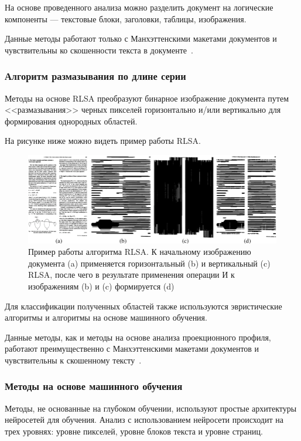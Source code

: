 На основе проведенного анализа можно разделить документ на логические компоненты --- текстовые блоки, заголовки, таблицы, изображения.

Данные методы работают только с Манхэттенскими макетами документов и чувствительны ко скошенности текста в документе~\cite{dla-book}.

\subsubsection{Алгоритм размазывания по длине серии}

Методы на основе RLSA преобразуют бинарное изображение документа путем <<размазывания>> черных пикселей горизонтально и/или вертикально для формирования однородных областей.

На рисунке ниже можно видеть пример работы RLSA.

\begin{figure}[H]
	\centering
	\includegraphics[width=\textwidth]{img/rlsa.png}
    \caption{Пример работы алгоритма RLSA. К начальному изображению документа (a) применяется горизонтальный (b) и вертикальный (c) RLSA, после чего в результате применения операции И к изображениям (b) и (c) формируется (d)}
	\label{fig:}
\end{figure}

Для классификации полученных областей также используются эвристические алгоритмы и алгоритмы на основе машинного обучения.

Данные методы, как и методы на основе анализа проекционного профиля, работают преимущественно с Манхэттенскими макетами документов и чувствительны к скошенному тексту~\cite{dla-book}.

\subsubsection{Методы на основе машинного обучения}

Методы, не основанные на глубоком обучении, используют простые архитектуры нейросетей для обучения.
Анализ с использованием нейросети происходит на трех уровнях: уровне пикселей, уровне блоков текста и уровне страниц.

